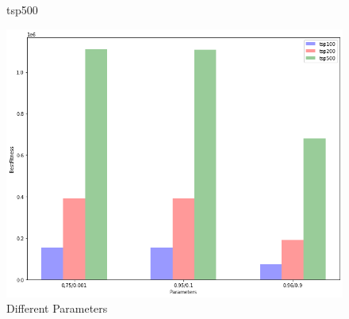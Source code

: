 \documentclass[11pt]{article}
\begin{document}
\begin{figure}[H]
    \centering
    \caption{tsp500}
\end{figure}

\begin{figure}[H]
    \centering
    \includegraphics[width=1\textwidth]{compare}
    \caption{Different Parameters}
\end{figure}
\end{document}
